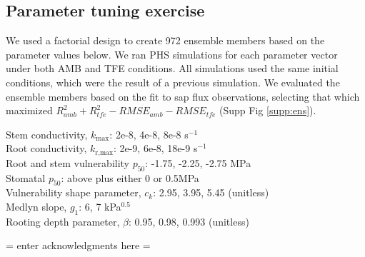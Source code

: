 \documentclass[draft,linenumbers]{agujournal}
\begin{document}
\subsection{Parameter tuning exercise}
\label{ens}

We used a factorial design to create 972 ensemble members based on the parameter values below.
We ran PHS simulations for each parameter vector under both AMB and TFE conditions.
All simulations used the same initial conditions, which were the result of a previous simulation.
We evaluated the ensemble members based on the fit to sap flux observations, selecting that which
 maximized $R^2_{amb}+R^2_{tfe}-RMSE_{amb}-RMSE_{tfe}$ (Supp Fig \ref{supp:ens}).

Stem conductivity, $k_{\text{max}}$: 2e-8, 4e-8, 8e-8 s$^{-1}$ \\
Root conductivity, $k_{\text{r,max}}$: 2e-9, 6e-8, 18e-9 s$^{-1}$ \\
Root and stem vulnerability $p_{50}$: -1.75, -2.25, -2.75 MPa \\
Stomatal $p_{50}$: above plus either 0 or 0.5MPa \\
Vulnerability shape parameter, $c_k$: 2.95, 3.95, 5.45 (unitless) \\
Medlyn slope, $g_1$: 6, 7 kPa$^{0.5}$ \\
Rooting depth parameter, $\beta$: 0.95, 0.98, 0.993 (unitless) 


\acknowledgments
 = enter acknowledgments here =

\nocite{*} 



\listofchanges
\end{document}
